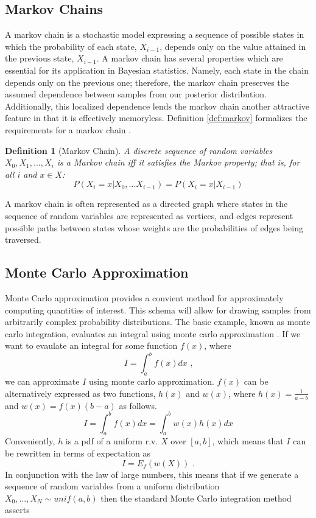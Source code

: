 \documentclass[
  12pt,
]{book}
\theoremstyle{definition}
\newtheorem{definition}{Definition}[chapter]
\theoremstyle{definition}
\theoremstyle{definition}
\theoremstyle{remark}
\begin{document}
\hypertarget{markov-chains}{%
\subsection{Markov Chains}\label{markov-chains}}

A markov chain is a stochastic model expressing a sequence of possible states in which the probability of each state, \(X_{i-1}\), depends only on the value attained in the previous state, \(X_{i-1}\).
A markov chain has several properties which are essential for its application in Bayesian statistics.
Namely, each state in the chain depends only on the previous one; therefore, the markov chain preserves the assumed dependence between samples from our posterior distribution.
Additionally, this localized dependence lends the markov chain another attractive feature in that it is effectively memoryless.
Definition \ref{def:markov} formalizes the requirements for a markov chain \citep{Wasserman2004}.

\begin{definition}[Markov Chain]
\protect\hypertarget{def:markov}{}{\label{def:markov} {} }\emph{A discrete sequence of random variables \({X_{0},X_{1},...,X_{i}}\) is a Markov chain iff it satisfies the Markov property; that is, for all \(i\) and \(x \in X\):}
\[P(X_{i}=x|X_{0},...X_{i-1})=P(X_{i}=x|X_{i-1})\]
\end{definition}

A markov chain is often represented as a directed graph where states in the sequence of random variables are represented as vertices, and edges represent possible paths between states whose weights are the probabilities of edges being traversed.

\hypertarget{monte-carlo-approximation}{%
\subsection{Monte Carlo Approximation}\label{monte-carlo-approximation}}

Monte Carlo approximation provides a convient method for approximately computing quantities of interest.
This schema will allow for drawing samples from arbitrarily complex probability distributions.
The basic example, known as monte carlo integration, evaluates an integral using monte carlo approximation \citep{Wasserman2004}.
If we want to evaulate an integral for some function \(f(x)\), where
\[I=\int_{a}^{b}f(x)dx \textrm{ ,}\]
we can approximate \(I\) using monte carlo approximation. \(f(x)\) can be alternatively expressed as two functions, \(h(x)\) and \(w(x)\), where \(h(x)=\frac{1}{a-b}\) and \(w(x)=f(x)(b-a)\) as follows.
\[I=\int_{a}^{b}f(x)dx=\int_{a}^{b}w(x)h(x)dx\]
Conveniently, \(h\) is a pdf of a uniform r.v. \(X\) over \([a,b]\), which means that \(I\) can be rewritten in terms of expectation as
\[I=E_{f}(w(X)) \textrm{ .}\]
In conjunction with the law of large numbers, this means that if we generate a sequence of random variables from a uniform distribution \(X_{0},...,X_{N}\sim unif(a,b)\) then the standard Monte Carlo integration method asserts
\end{document}
